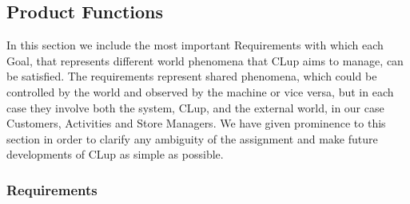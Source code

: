 \documentclass{article}
\begin{document}
	\subsection{Product Functions}
	In this section we include the most important Requirements with which each Goal, that represents different world phenomena that CLup aims to manage, can be satisfied. The requirements represent shared phenomena, which could be controlled by the world and observed by the machine or vice versa, but in each case they involve both the system, CLup, and the external world, in our case Customers, Activities and Store Managers. We have given prominence to this section in order to clarify any ambiguity of the assignment and make future developments of CLup as simple as possible.
		
	\subsubsection{Requirements}
	
\end{document}
